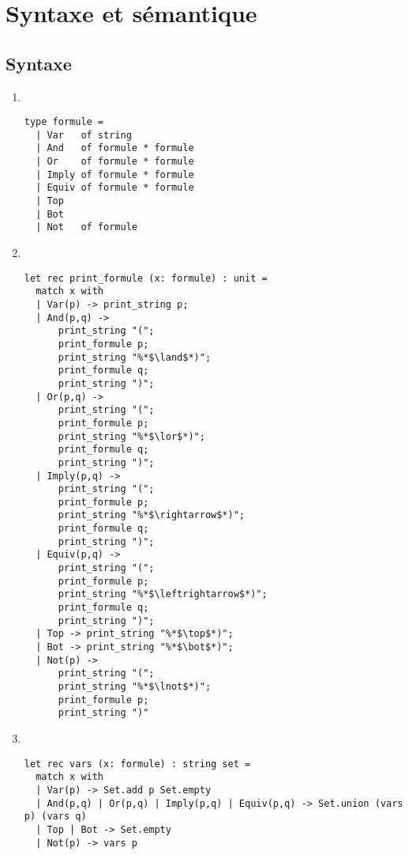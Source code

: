 \section{Syntaxe et sémantique}
\subsection{Syntaxe}

\begin{enumerate}
	\item~
		\begin{lstlisting}[language=caml,caption=Définition du type \texttt{formule} représentant les éléments de $\mathcal{F}$\/]
type formule =
  | Var   of string
  | And   of formule * formule
  | Or    of formule * formule
  | Imply of formule * formule
  | Equiv of formule * formule
  | Top
  | Bot
  | Not   of formule
		\end{lstlisting}
	\item~
		\begin{lstlisting}[language=caml,caption=Affichage du type \texttt{formule}]
let rec print_formule (x: formule) : unit =
  match x with
  | Var(p) -> print_string p;
  | And(p,q) ->
      print_string "(";
      print_formule p;
      print_string "%*$\land$*)";
      print_formule q;
      print_string ")";
  | Or(p,q) ->
      print_string "(";
      print_formule p;
      print_string "%*$\lor$*)";
      print_formule q;
      print_string ")";
  | Imply(p,q) ->
      print_string "(";
      print_formule p;
      print_string "%*$\rightarrow$*)";
      print_formule q;
      print_string ")";
  | Equiv(p,q) ->
      print_string "(";
      print_formule p;
      print_string "%*$\leftrightarrow$*)";
      print_formule q;
      print_string ")";
  | Top -> print_string "%*$\top$*)";
  | Bot -> print_string "%*$\bot$*)";
  | Not(p) ->
      print_string "(";
      print_string "%*$\lnot$*)";
      print_formule p;
      print_string ")"
		\end{lstlisting}
	\item~
		\begin{lstlisting}[language=caml,caption=Ensemble de variables d'une formule de type \texttt{formule}]
let rec vars (x: formule) : string set =
  match x with
  | Var(p) -> Set.add p Set.empty
  | And(p,q) | Or(p,q) | Imply(p,q) | Equiv(p,q) -> Set.union (vars p) (vars q)
  | Top | Bot -> Set.empty
  | Not(p) -> vars p
		\end{lstlisting}
\end{enumerate}

